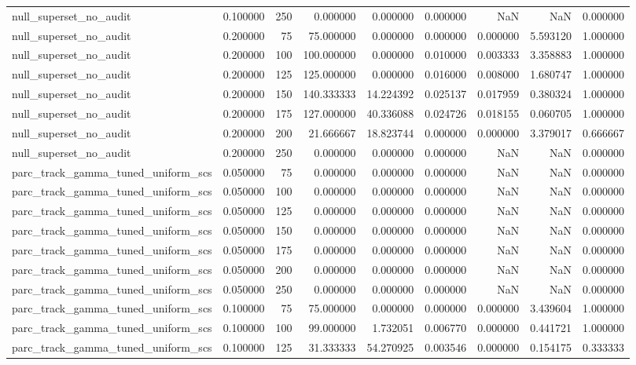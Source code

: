 \begin{tabular}{lrrrrrrrr}
null_superset_no_audit & 0.100000 & 250 & 0.000000 & 0.000000 & 0.000000 & NaN & NaN & 0.000000 \\
null_superset_no_audit & 0.200000 & 75 & 75.000000 & 0.000000 & 0.000000 & 0.000000 & 5.593120 & 1.000000 \\
null_superset_no_audit & 0.200000 & 100 & 100.000000 & 0.000000 & 0.010000 & 0.003333 & 3.358883 & 1.000000 \\
null_superset_no_audit & 0.200000 & 125 & 125.000000 & 0.000000 & 0.016000 & 0.008000 & 1.680747 & 1.000000 \\
null_superset_no_audit & 0.200000 & 150 & 140.333333 & 14.224392 & 0.025137 & 0.017959 & 0.380324 & 1.000000 \\
null_superset_no_audit & 0.200000 & 175 & 127.000000 & 40.336088 & 0.024726 & 0.018155 & 0.060705 & 1.000000 \\
null_superset_no_audit & 0.200000 & 200 & 21.666667 & 18.823744 & 0.000000 & 0.000000 & 3.379017 & 0.666667 \\
null_superset_no_audit & 0.200000 & 250 & 0.000000 & 0.000000 & 0.000000 & NaN & NaN & 0.000000 \\
parc_track_gamma_tuned_uniform_scs & 0.050000 & 75 & 0.000000 & 0.000000 & 0.000000 & NaN & NaN & 0.000000 \\
parc_track_gamma_tuned_uniform_scs & 0.050000 & 100 & 0.000000 & 0.000000 & 0.000000 & NaN & NaN & 0.000000 \\
parc_track_gamma_tuned_uniform_scs & 0.050000 & 125 & 0.000000 & 0.000000 & 0.000000 & NaN & NaN & 0.000000 \\
parc_track_gamma_tuned_uniform_scs & 0.050000 & 150 & 0.000000 & 0.000000 & 0.000000 & NaN & NaN & 0.000000 \\
parc_track_gamma_tuned_uniform_scs & 0.050000 & 175 & 0.000000 & 0.000000 & 0.000000 & NaN & NaN & 0.000000 \\
parc_track_gamma_tuned_uniform_scs & 0.050000 & 200 & 0.000000 & 0.000000 & 0.000000 & NaN & NaN & 0.000000 \\
parc_track_gamma_tuned_uniform_scs & 0.050000 & 250 & 0.000000 & 0.000000 & 0.000000 & NaN & NaN & 0.000000 \\
parc_track_gamma_tuned_uniform_scs & 0.100000 & 75 & 75.000000 & 0.000000 & 0.000000 & 0.000000 & 3.439604 & 1.000000 \\
parc_track_gamma_tuned_uniform_scs & 0.100000 & 100 & 99.000000 & 1.732051 & 0.006770 & 0.000000 & 0.441721 & 1.000000 \\
parc_track_gamma_tuned_uniform_scs & 0.100000 & 125 & 31.333333 & 54.270925 & 0.003546 & 0.000000 & 0.154175 & 0.333333 \\

\end{tabular}
